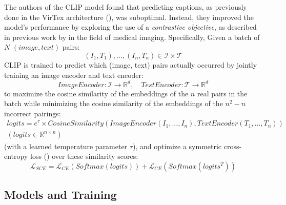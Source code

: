 \documentclass{article}
\begin{document}
\medskip
\noindent
The authors of the CLIP model found that predicting captions, as previously done in the VirTex architecture (\citet{desai2021virtex}), was suboptimal. Instead, they improved the model's performance by exploring the use of a \emph{contrastive objective}, as described in previous work by \citet{zhang2022contrastive} in the field of medical imaging. Specifically, Given a batch of $N$ $(image, text)$ pairs:
\begin{equation*}
    (I_1,T_1),...,(I_n,T_n) \in \mathcal{I} \times \mathcal{T}
\end{equation*}
CLIP is trained to predict which (image, text) pairs actually occurred by jointly training an image encoder and text encoder:
\begin{equation*}
    ImageEncoder: \mathcal{I} \rightarrow \mathbb{R}^d, \quad 
    TestEncoder: \mathcal{T} \rightarrow \mathbb{R}^d
\end{equation*}
to maximize the cosine similarity of the embeddings of the $n$ real pairs in the batch while minimizing the cosine similarity of the embeddings of the $n^2-n$ incorrect pairings:
\begin{equation*}
    \begin{gathered}
         logits =e^{\tau} \times  CosineSimilarity(ImageEncoder(I_1,...,I_n), TextEncoder(T_1,...,T_n)) \\
         (logits \in \mathbb{R}^{n \times n})
    \end{gathered}
\end{equation*}
(with a learned temperature parameter $\tau$), and optimize a symmetric cross-entropy loss (\citet{wang2019symmetric}) over these similarity scores:
\begin{equation*}
    \mathcal{L}_{SCE} = \mathcal{L}_{CE}(Softmax(logits)) + \mathcal{L}_{CE}(Softmax(logits^T))
\end{equation*}



\subsection{Models and Training}
\label{sec:clip-training}
\end{document}
